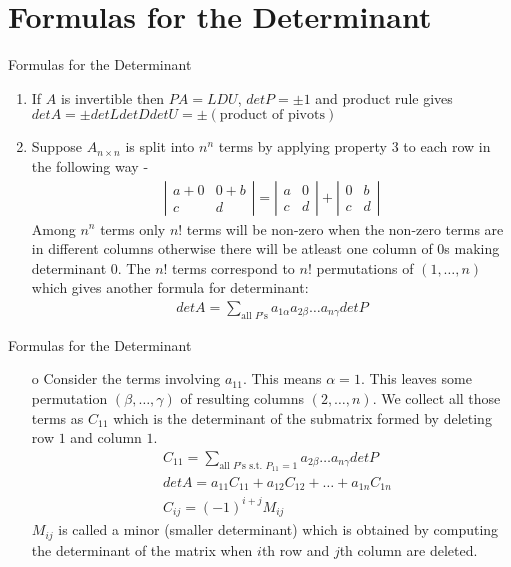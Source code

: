 \documentclass{beamer}
\begin{document}
\section{Formulas for the Determinant}
\begin{frame}{Formulas for the Determinant}
\begin{enumerate}
    \item If $A$ is invertible then $PA=LDU$, $detP=\pm 1$ and product rule gives $detA = \pm detLdetDdetU = \pm (\text{product of pivots})$
    \item Suppose $A_{n\times n}$ is split into $n^n$ terms by applying property $3$ to each row in the following way -
    \begin{align*}
        \left|\begin{matrix}a+0&0+b\\c&d\end{matrix}\right| = \left|\begin{matrix}a&0\\c&d\end{matrix}\right|+\left|\begin{matrix}0&b\\c&d\end{matrix}\right|
    \end{align*}
    Among $n^n$ terms only $n!$ terms will be non-zero when the non-zero terms are in different columns otherwise there will be atleast one column of $0$s making determinant $0$. The $n!$ terms correspond to $n!$ permutations of $(1,\ldots,n)$ which gives another formula for determinant:
    \begin{align*}
        detA = \sum_{\text{all } P\text{'s}}a_{1\alpha}a_{2\beta}\ldots a_{n\gamma}detP
    \end{align*}
\end{enumerate}
\end{frame}

\begin{frame}{Formulas for the Determinant}
\begin{itemize}
    \item[o] Consider the terms involving $a_11$. This means $\alpha=1$. This leaves some permutation $(\beta,\ldots,\gamma)$ of resulting columns $(2,\ldots,n)$. We collect all those terms as $C_{11}$ which is the determinant of the submatrix formed by deleting row $1$ and column $1$.
    \begin{align*}
        &C_{11} = \sum_{\text{all } P\text{'s s.t. }  P_{11}=1}a_{2\beta}\ldots a_{n\gamma}detP\\
        &detA = a_{11}C_{11}+a_{12}C_{12}+\ldots+a_{1n}C_{1n}\\
        &C_{ij} = (-1)^{i+j}M_{ij}
    \end{align*}
    $M_{ij}$ is called a minor (smaller determinant) which is obtained by computing the determinant of the matrix when $i$th row and $j$th column are deleted.
\end{itemize}
\end{frame}
\end{document}
